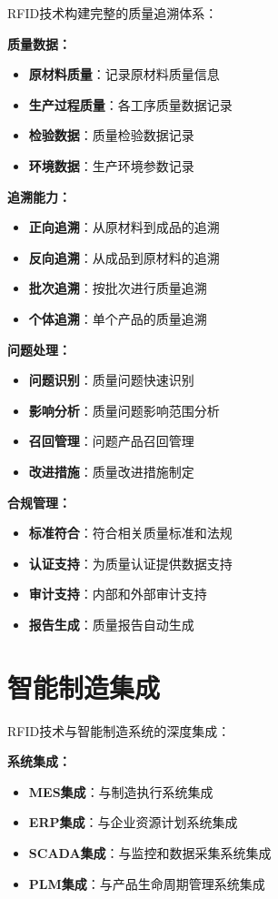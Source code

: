 \documentclass[12pt,UTF8]{ctexbook}
\begin{document}
\begin{itemize}[leftmargin=3.5em]
\begin{itemize}[leftmargin=3.5em]
\begin{itemize}[leftmargin=3.5em]
\begin{itemize}[leftmargin=3.5em]
RFID技术构建完整的质量追溯体系：

\textbf{质量数据：}
\begin{itemize}[leftmargin=3.5em]
    \item \textbf{原材料质量}：记录原材料质量信息
    \item \textbf{生产过程质量}：各工序质量数据记录
    \item \textbf{检验数据}：质量检验数据记录
    \item \textbf{环境数据}：生产环境参数记录
\end{itemize}

\textbf{追溯能力：}
\begin{itemize}[leftmargin=3.5em]
    \item \textbf{正向追溯}：从原材料到成品的追溯
    \item \textbf{反向追溯}：从成品到原材料的追溯
    \item \textbf{批次追溯}：按批次进行质量追溯
    \item \textbf{个体追溯}：单个产品的质量追溯
\end{itemize}

\textbf{问题处理：}
\begin{itemize}[leftmargin=3.5em]
    \item \textbf{问题识别}：质量问题快速识别
    \item \textbf{影响分析}：质量问题影响范围分析
    \item \textbf{召回管理}：问题产品召回管理
    \item \textbf{改进措施}：质量改进措施制定
\end{itemize}

\textbf{合规管理：}
\begin{itemize}[leftmargin=3.5em]
    \item \textbf{标准符合}：符合相关质量标准和法规
    \item \textbf{认证支持}：为质量认证提供数据支持
    \item \textbf{审计支持}：内部和外部审计支持
    \item \textbf{报告生成}：质量报告自动生成
\end{itemize}

\section{智能制造集成}

RFID技术与智能制造系统的深度集成：

\textbf{系统集成：}
\begin{itemize}[leftmargin=3.5em]
    \item \textbf{MES集成}：与制造执行系统集成
    \item \textbf{ERP集成}：与企业资源计划系统集成
    \item \textbf{SCADA集成}：与监控和数据采集系统集成
    \item \textbf{PLM集成}：与产品生命周期管理系统集成
\end{itemize}


\end{itemize}
\end{itemize}
\end{itemize}
\end{itemize}
\end{document}
